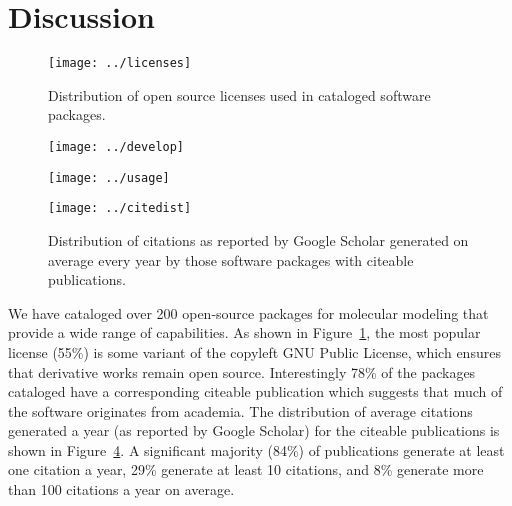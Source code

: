 \section{Discussion}

\begin{figure}
\centering 
\texttt{[image: ../licenses]}
\caption{\label{licenses} Distribution of open source licenses used in cataloged software packages.}
\end{figure}

\begin{figure*}
\centering
\begin{subfigure}[t]{.4\linewidth}
\centering 
\texttt{[image: ../develop]}
\caption{\label{develop}}
\end{subfigure}
\hfill
\begin{subfigure}[t]{.4\linewidth}
\centering 
\texttt{[image: ../usage]}
\caption{\label{usage}}
\end{subfigure}
\caption{\label{pies} Activity distributions of cataloged software packages.
() Distribution of development activity. () Distribution of user activity.
}
\end{figure*}

\begin{figure}
\centering 
\texttt{[image: ../citedist]}
\caption{\label{cites} Distribution of citations as reported by Google Scholar generated on average every year by those software packages with citeable publications.}
\end{figure}


We have cataloged over 200 open-source packages for molecular modeling that provide a wide range of capabilities.  As shown in Figure~\ref{licenses}, the most popular license (55\%) is some variant of the copyleft GNU Public License, which ensures that derivative works remain open source.  Interestingly 78\% of the packages cataloged have a corresponding citeable publication which suggests that much of the software originates from academia.   The distribution of average citations generated a year (as reported by Google Scholar) for the citeable publications is shown in Figure~\ref{cites}.  A significant majority (84\%) of publications generate at least one citation a year, 29\% generate at least 10 citations, and 8\% generate more than 100 citations a year on average.

